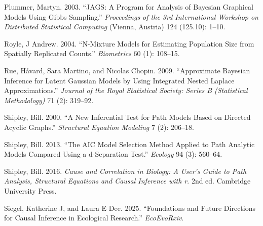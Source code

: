 \documentclass[
]{article}
\newlength{\cslhangindent}
\newenvironment{CSLReferences}[2] %
 {\begin{list}{}{%
  \setlength{\itemindent}{0pt}
  \setlength{\leftmargin}{0pt}
  \setlength{\parsep}{0pt}
  \ifodd #1
   \setlength{\leftmargin}{\cslhangindent}
   \setlength{\itemindent}{-1\cslhangindent}
  \fi
  \setlength{\itemsep}{#2\baselineskip}}}
 {\end{list}}
\begin{document}
\begin{CSLReferences}{1}{1}
Plummer, Martyn. 2003. {``JAGS: A Program for Analysis of Bayesian Graphical Models Using Gibbs Sampling.''} \emph{Proceedings of the 3rd International Workshop on Distributed Statistical Computing} (Vienna, Austria) 124 (125.10): 1--10.

Royle, J Andrew. 2004. {``N-Mixture Models for Estimating Population Size from Spatially Replicated Counts.''} \emph{Biometrics} 60 (1): 108--15.

Rue, Håvard, Sara Martino, and Nicolas Chopin. 2009. {``Approximate Bayesian Inference for Latent Gaussian Models by Using Integrated Nested Laplace Approximations.''} \emph{Journal of the Royal Statistical Society: Series B (Statistical Methodology)} 71 (2): 319--92.

Shipley, Bill. 2000. {``A New Inferential Test for Path Models Based on Directed Acyclic Graphs.''} \emph{Structural Equation Modeling} 7 (2): 206--18.

Shipley, Bill. 2013. {``The AIC Model Selection Method Applied to Path Analytic Models Compared Using a d-Separation Test.''} \emph{Ecology} 94 (3): 560--64.

Shipley, Bill. 2016. \emph{Cause and Correlation in Biology: A User's Guide to Path Analysis, Structural Equations and Causal Inference with r}. 2nd ed. Cambridge University Press.

Siegel, Katherine J, and Laura E Dee. 2025. {``Foundations and Future Directions for Causal Inference in Ecological Research.''} \emph{EcoEvoRxiv}.

\end{CSLReferences}
\end{document}
